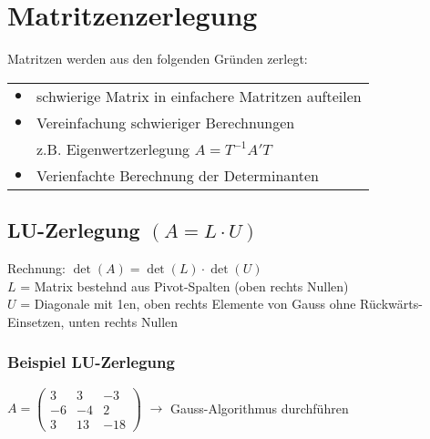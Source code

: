     
		 \section{Matritzenzerlegung}
		 Matritzen werden aus den folgenden Gründen zerlegt: \\
		 \begin{tabular}{ll}
		 $\bullet$ &  schwierige Matrix in einfachere Matritzen aufteilen \\
		 $\bullet$ & Vereinfachung schwieriger Berechnungen \\
		 & z.B. Eigenwertzerlegung $A = T^{-1} A' T$ \\
		 $\bullet$ & Verienfachte Berechnung der Determinanten 
		 \end{tabular}
		 
		 \vfill\null
		 \columnbreak
		 
		 
		    \subsection{LU-Zerlegung $(A = L \cdot U)$}
			Rechnung: \quad  $\det(A) =  \det(L) \cdot \det(U)$ \\ 
			$L$ = Matrix bestehnd aus Pivot-Spalten (oben rechts Nullen) \\
			$U$ = Diagonale mit 1en, oben rechts Elemente von Gauss ohne Rückwärts-Einsetzen, unten rechts Nullen \\	
			
			\subsubsection{Beispiel LU-Zerlegung}
			
			$A = \begin{pmatrix}	3 & 3 & -3 \\ -6 & -4 & 2 \\ 3 & 13 & -18 \end{pmatrix}$ \qquad $\rightarrow$ Gauss-Algorithmus durchführen \\
			\vspace{0.3cm}
			
